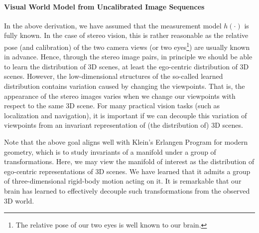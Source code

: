 \documentclass[../../book-main.tex]{subfiles}
\begin{document}


\paragraph{Visual World Model from Uncalibrated Image Sequences}

In the above derivation, we have assumed that the measurement model $h(\cdot)$ is fully known. In the case of stereo vision, this is rather reasonable as the relative pose (and calibration) of the two camera views (or two eyes\footnote{The relative pose of our two eyes is well known to our brain.}) are usually known in advance. Hence, through the stereo image pairs, in principle we should be able to learn the distribution of 3D scenes, at least the ego-centric distribution of 3D scenes. However, the low-dimensional structures of the so-called learned distribution contains variation caused by changing the viewpoints. That is, the appearance of the stereo images varies when we change our viewpoints with respect to the same 3D scene. For many practical vision tasks (such as localization and navigation), it is important if we can decouple this variation of viewpoints from an invariant representation of (the distribution of) 3D scenes.

\begin{remark}Note that the above goal aligns well with Klein's Erlangen Program for modern geometry, which is to study invariants of a manifold under a group of transformations. Here, we may view the manifold of interest as the distribution of ego-centric representations of 3D scenes. We have learned that it admits a group of three-dimensional rigid-body motion acting on it. It is remarkable that our brain has learned to effectively decouple such transformations from the observed 3D world.
\end{remark}
\end{document}
